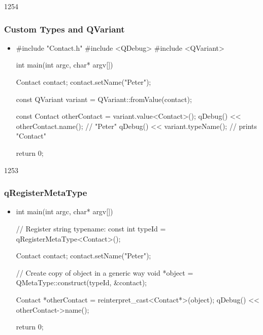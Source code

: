\begin{slide}[fragile]{1254}
\frametitle{Custom Types and QVariant}

\begin{itemize}
\item[]
\begin{cpp}
#include "Contact.h"
#include <QDebug>
#include <QVariant>

int main(int argc, char* argv[])
{
    Contact contact;
    contact.setName("Peter");

    const QVariant variant = QVariant::fromValue(contact);

    const Contact otherContact = variant.value<Contact>();
    qDebug() << otherContact.name(); // "Peter"
    qDebug() << variant.typeName();  // prints "Contact"

    return 0;
}
\end{cpp}
\end{itemize}
\end{slide}

\begin{slide}[fragile]{1253}
\frametitle{qRegisterMetaType}
\begin{itemize}
\item[]
\begin{cpp}
int main(int argc, char* argv[])
{
    // Register string typename:
    const int typeId = qRegisterMetaType<Contact>();

    Contact contact;
    contact.setName("Peter");

    // Create copy of object in a generic way
    void *object = QMetaType::construct(typeId, &contact);

    Contact *otherContact = reinterpret_cast<Contact*>(object);
    qDebug() << otherContact->name();

    return 0;
}
\end{cpp}
\end{itemize}
\end{slide}


